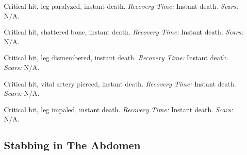 \documentclass[12pt]{book}
\begin{document}
\begin{description}[labelwidth=1.5em, leftmargin=*, itemsep=0.4em]
    \item[16 -] Critical hit, leg paralyzed, instant death. \textit{Recovery Time:} Instant death. \textit{Scars:} N/A.
    \item[17 -] Critical hit, shattered bone, instant death. \textit{Recovery Time:} Instant death. \textit{Scars:} N/A.
    \item[18 -] Critical hit, leg dismembered, instant death. \textit{Recovery Time:} Instant death. \textit{Scars:} N/A.
    \item[19 -] Critical hit, vital artery pierced, instant death. \textit{Recovery Time:} Instant death. \textit{Scars:} N/A.
    \item[20 -] Critical hit, leg impaled, instant death. \textit{Recovery Time:} Instant death. \textit{Scars:} N/A.
\end{description}

\subsection{Stabbing in The Abdomen}
\end{document}
